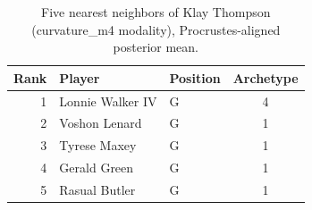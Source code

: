 \begin{table}[htbp]
  \centering\small
  \begin{tabular}{rllc}
    \toprule
    Rank & Player & Position & Archetype \\
    \midrule
    1 & Lonnie Walker IV & G & 4 \\
    2 & Voshon Lenard & G & 1 \\
    3 & Tyrese Maxey & G & 1 \\
    4 & Gerald Green & G & 1 \\
    5 & Rasual Butler & G & 1 \\
    \bottomrule
  \end{tabular}
  \caption{Five nearest neighbors of Klay Thompson (curvature_m4 modality), Procrustes-aligned posterior mean.}
  \label{tab:Klay_Thompson_neighbors_curvature_m4}
\end{table}

